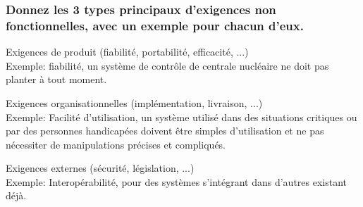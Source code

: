 \subsubsection{Donnez les 3 types principaux d’exigences non fonctionnelles, avec un exemple pour chacun d’eux.}
\color[rgb]{0,0.48,0.58}
Exigences de produit (fiabilité, portabilité, efficacité, ...)
\\Exemple: fiabilité, un système de contrôle de centrale nucléaire ne doit pas planter à tout moment.

Exigences organisationnelles (implémentation, livraison, ...) 
\\Exemple: Facilité d’utilisation, un système utilisé dans des situations critiques ou par des personnes handicapées doivent être simples d’utilisation et ne pas nécessiter de manipulations précises et compliqués.

Exigences externes (sécurité, législation, ...)
\\Exemple: Interopérabilité, pour des systèmes s’intégrant dans d’autres existant déjà.
\color[rgb]{0,0,0}